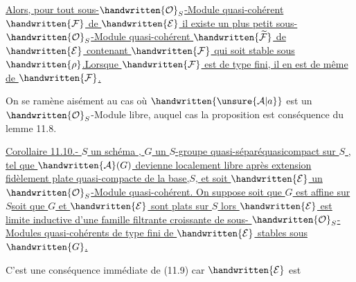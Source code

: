 \uline{Alors, pour tout sous-$\handwritten{\mathcal{O}}_S$-Module quasi-cohérent $\handwritten{\mathcal{F}}$ de $\handwritten{\mathcal{E}}$ il existe un plus petit sous-$\handwritten{\mathcal{O}}_S$-Module quasi-cohérent $\handwritten{\widetilde{\mathcal{F}}}$ de $\handwritten{\mathcal{E}}$ contenant $\handwritten{\mathcal{F}}$ qui soit stable sous $\handwritten{\rho}$.}\uline{Lorsque $\handwritten{\mathcal{F}}$ est de type  fini, il en est de même de $\handwritten{\mathcal{F}}$.}

On se ramène aisément au cas où $\handwritten{\unsure{\mathcal{A}|a}}$ est un $\handwritten{\mathcal{O}}_S$-Module libre, auquel cas la proposition est conséquence du lemme 11.8.

\uline{Corollaire 11.10.-  $S$ un  schéma , $G$ un $S$-groupe quasi-séparéquasicompact sur $S$ , tel que $\handwritten{\mathcal{A}}(G)$ devienne  localement libre après extension fidèlement plate quasi-compacte de la base,$S$, et soit $\handwritten{\mathcal{E}}$ un $\handwritten{\mathcal{O}}_S$-Module quasi-cohérent. On suppose soit que $G$ est affine sur $S$\handwritten{,}soit que $G$ et $\handwritten{\mathcal{E}}$ sont plats sur $S$ lors $\handwritten{\mathcal{E}}$ est limite inductive d'une famille filtrante croissante de sous- $\handwritten{\mathcal{O}}_S$-Modules quasi-cohérents de type fini de $\handwritten{\mathcal{E}}$ stables sous $\handwritten{G}$.}

C'est une conséquence immédiate de (11.9) car $\handwritten{\mathcal{E}}$ est 


